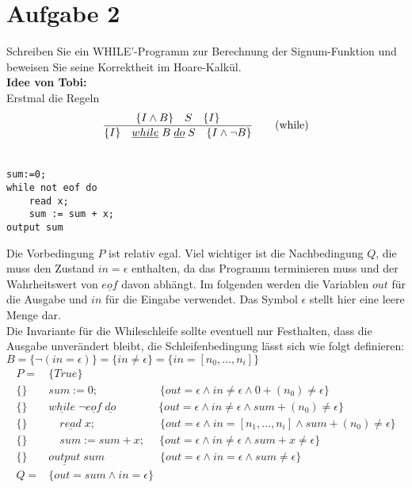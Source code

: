 \documentclass[ngerman,a4paper]{report}
\begin{document}
\section*{Aufgabe 2}
Schreiben Sie ein WHILE'-Programm zur Berechnung der Signum-Funktion und beweisen Sie seine Korrektheit im Hoare-Kalkül.\\
\textbf{Idee von Tobi:}\\
Erstmal die Regeln
\begin{align}
\frac{\{I\land B\}\quad S\quad\{I\}}{\{I\}\quad \underline{while}\;B\;\underline{do}\;S\quad\{I\land \lnot B\}}\tag{while}\\
\notag
\end{align}
\begin{lstlisting}
sum:=0;
while not eof do
	read x;
	sum := sum + x;
output sum
\end{lstlisting}
Die Vorbedingung $P$ ist relativ egal. Viel wichtiger ist die Nachbedingung $Q$, die muss den Zustand $in=\epsilon$ enthalten, da das Programm terminieren muss und der Wahrheitswert von $\underline{eof}$ davon abhängt. Im folgenden werden die Variablen $out$ für die Ausgabe und $in$ für die Eingabe verwendet. Das Symbol $\epsilon$ stellt hier eine leere Menge dar.\\
Die Invariante für die Whileschleife sollte eventuell nur Festhalten, dass die Ausgabe unverändert bleibt, die Schleifenbedingung lässt sich wie folgt definieren:\\ $B = \{\lnot(in = \epsilon) \} = \{in \neq \epsilon\} = \{in = [n_0,\dots,n_i]\}$
\begin{align*}
P = &\{True\}																						\\
\{\} \quad		&sum:=0; 		\;\;\quad\quad\quad\quad\quad	\{out = \epsilon \land in \neq \epsilon \land 0 + (n_0) \neq \epsilon\}				\\
\{\} \quad 		&\underline{while}\; \lnot \underline{eof}\; \underline{do}\;		\;\;\quad\quad\quad	\{out = \epsilon \land in \neq \epsilon \land sum + (n_0) \neq \epsilon\}	\\
\{\} \quad 		&\quad	\underline{read}\; x;	\ \;\;\quad\quad\quad\quad\quad	\{out = \epsilon \land in = [n_1, \dots, n_i] \land sum + (n_0) \neq \epsilon\}\\
\{\} \quad 		&\quad	sum := sum + x;												\;\quad\{out = \epsilon \land in \neq \epsilon \land sum + x \neq \epsilon\}\\
\{\} \quad 		&\underline{output}\; sum							\quad\quad\quad\quad\quad\{out = \epsilon \land in = \epsilon \land sum \neq \epsilon \}	\\
Q = &\{out = sum \land in = \epsilon \}																\\
\end{align*}
\end{document}
